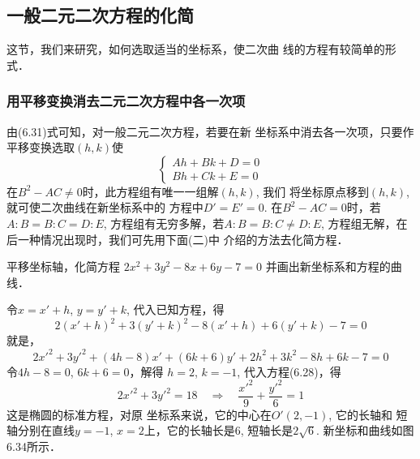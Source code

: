 \subsection{一般二元二次方程的化简}
这节，我们来研究，如何选取适当的坐标系，使二次曲
线的方程有较简单的形式．

\subsubsection{用平移变换消去二元二次方程中各一次项}
由(6.31)式可知，对一般二元二次方程，若要在新
坐标系中消去各一次项，只要作平移变换选取$(h,k)$使
\[\begin{cases}
   Ah+Bk+D=0\\
Bh+Ck+E=0
\end{cases}\]
在$B^2-AC\ne 0$时，此方程组有唯一一组解$(h,k)$, 我们
将坐标原点移到$(h,k)$, 就可使二次曲线在新坐标系中的
方程中$D'=E'=0$. 在$B^2-AC=0$时，若$A:B=B:C
=D:E$, 方程组有无穷多解，若$A:B=B:C\ne D:E$, 
方程组无解，在后一种情况出现时，我们可先用下面(二)中
介绍的方法去化简方程．

\begin{example}
    平移坐标轴，化简方程
$2x^2+3y^2-8x+6y-7=0$
并画出新坐标系和方程的曲线．
\end{example}

\begin{solution}
    令$x=x'+h$, $y=y'+k$, 代入已知方程，得
\[2(x'+h)^2+3(y'+k)^2-8(x'+h)+6(y'+k)-7=0\]
就是，
\[2{x'}^2+3{y'}^2+(4h-8)x'+(6k+6)y'+2h^2+3k^2
-8h+6k-7=0\]
令$4h-8=0$, $6k+6=0$，解得
$h=2$, $k=-1$, 代入方程(6.28)，得
\[2{x'}^2+3{y'}^2=18\quad \Rightarrow\quad \frac{{x'}^2}{9}+\frac{{y'}^2}{6}=1\]
这是椭圆的标准方程，对原
坐标系来说，它的中心在$O'(2,-1)$, 它的长轴和
短轴分别在直线$y=-1$, 
$x=2$上，它的长轴长是6, 短轴长是$2\sqrt{6}$. 新坐标和曲线如图6.34所示．
\end{solution}

